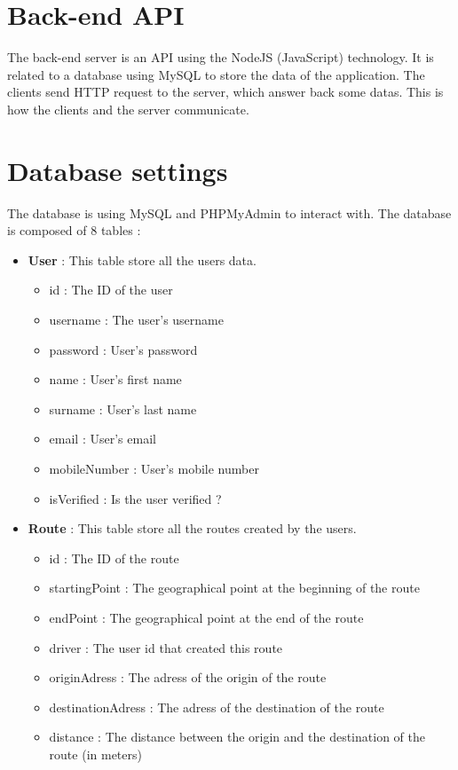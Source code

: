 \section{Back-end API}
The back-end server is an API using the NodeJS (JavaScript) technology. It is related to a database using MySQL to store the data of the application. The clients send HTTP request to the server, which answer back some datas. This is how the clients and the server communicate.

\section{Database settings}
The database is using MySQL and PHPMyAdmin to interact with. The database is composed of 8 tables :
\begin{itemize}
    \item \textbf{User} : This table store all the users data.
    \begin{itemize}
    	\item id : The ID of the user
    	\item username : The user's username
    	\item password : User's password
    	\item name : User's first name
    	\item surname : User's last name
    	\item email	: User's email
    	\item mobileNumber : User's mobile number
    	\item isVerified : Is the user verified ?
    \end{itemize}
    \item \textbf{Route} : This table store all the routes created by the users.
    \begin{itemize}
    	\item id : The ID of the route
    	\item startingPoint : The geographical point at the beginning of the route
    	\item endPoint : The geographical point at the end of the route
    	\item driver : The user id that created this route
    	\item originAdress : The adress of the origin of the route
    	\item destinationAdress	: The adress of the destination of the route
    	\item distance : The distance between the origin and the destination of the route (in meters)

\end{itemize}
\end{itemize}
